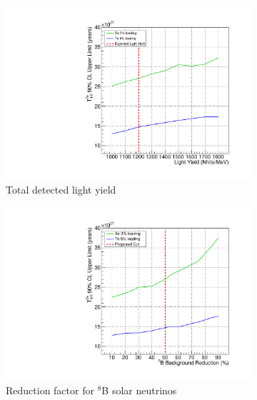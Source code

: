 \begin{figure}
\centering
\begin{subfigure}[b]{0.49\textwidth}
 \includegraphics[width=\textwidth]{dbd/ly_fc.pdf}
 \caption{Total detected light yield}
 \label{fig:scale-ly}
\end{subfigure}
\begin{subfigure}[b]{0.49\textwidth}
 \includegraphics[width=\textwidth]{dbd/b8_reduction_fc.pdf}
 \caption{Reduction factor for $^8$B solar neutrinos}
 \label{fig:scale-b8}
\end{subfigure}\\
\begin{subfigure}[b]{0.49\textwidth}

\end{subfigure}
\end{figure}

